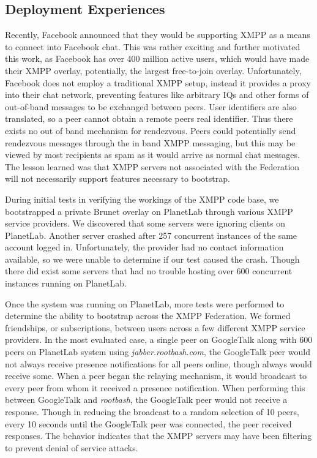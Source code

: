 \documentclass[conference]{IEEEtran}
\begin{document}
\subsection{Deployment Experiences}

Recently, Facebook announced that they would be supporting XMPP as a means to
connect into Facebook chat.  This was rather exciting and further motivated
this work, as Facebook has over 400 million active users, which would have made
their XMPP overlay, potentially, the largest free-to-join overlay.
Unfortunately, Facebook does not employ a traditional XMPP setup, instead it
provides a proxy into their chat network, preventing features like arbitrary
IQs and other forms of out-of-band messages to be exchanged between peers.
User identifiers are also translated, so a peer cannot obtain a remote peers
real identifier.  Thus there exists no out of band mechanism for rendezvous.
Peers could potentially send rendezvous messages through the in band XMPP
messaging, but this may be viewed by most recipients as spam as it would
arrive as normal chat messages.  The lesson learned was that XMPP servers
not associated with the Federation will not necessarily support features
necessary to bootstrap.

During initial tests in verifying the workings of the XMPP code base, we
bootstrapped a  private Brunet overlay on PlanetLab through various XMPP
service providers.  We discovered that some servers were ignoring clients on
PlanetLab.  Another server crashed after 257 concurrent instances of the same
account logged in.  Unfortunately, the provider had no contact information
available, so we were unable to determine if our test caused the crash.  Though
there did exist some servers that had no trouble hosting over 600 concurrent
instances running on PlanetLab.

Once the system was running on PlanetLab, more tests were performed to
determine the ability to bootstrap across the XMPP Federation.  We formed
friendships, or subscriptions, between users across a few different XMPP
service providers.  In the most evaluated case, a single peer on GoogleTalk
along with 600 peers on PlanetLab system using \textit{jabber.rootbash.com},
the GoogleTalk peer would not always receive presence notifications for all
peers online, though always would receive some.  When a peer began the relaying
mechanism, it would broadcast to every peer from whom it received a presence
notification.  When performing this between GoogleTalk and \textit{rootbash},
the GoogleTalk peer would not receive a response.  Though in reducing the
broadcast to a random selection of 10 peers, every 10 seconds until the
GoogleTalk peer was connected, the peer received responses.  The behavior
indicates that the XMPP servers may have been filtering to prevent denial of
service attacks.
\end{document}
